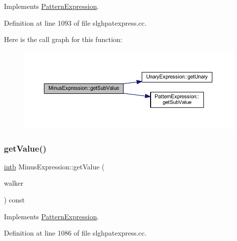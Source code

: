 Implements \mbox{\hyperlink{class_pattern_expression_ade37db4aa76dd442b189bf4a6bb2d9dd}{Pattern\+Expression}}.



Definition at line 1093 of file slghpatexpress.\+cc.

Here is the call graph for this function\+:
\nopagebreak
\begin{figure}[H]
\begin{center}
\leavevmode
\includegraphics[width=350pt]{class_minus_expression_a8abb994d8568893e03dd5ddfc7fc026a_cgraph}
\end{center}
\end{figure}
\mbox{\label{class_minus_expression_a70ffca1486be90676a669b34e9b3b6be}} 
\subsubsection{\texorpdfstring{getValue()}{getValue()}}
{\footnotesize\ttfamily \mbox{\hyperlink{types_8h_aa925ba3e627c2df89d5b1cfe84fb8572}{intb}} Minus\+Expression\+::get\+Value (\begin{DoxyParamCaption}\item[{\mbox{\hyperlink{class_parser_walker}{Parser\+Walker}} \&}]{walker }\end{DoxyParamCaption}) const\hspace{0.3cm}{\ttfamily [virtual]}}



Implements \mbox{\hyperlink{class_pattern_expression_a8332c6ea4c5a7e9dfc690df2a6458bb8}{Pattern\+Expression}}.



Definition at line 1086 of file slghpatexpress.\+cc.

